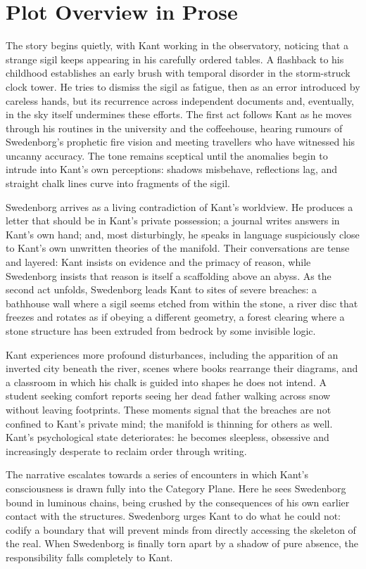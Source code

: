 \documentclass[12pt]{article}
\begin{document}
\section*{Plot Overview in Prose}

The story begins quietly, with Kant working in the observatory, noticing that a strange sigil keeps appearing in his carefully ordered tables. A flashback to his childhood establishes an early brush with temporal disorder in the storm-struck clock tower. He tries to dismiss the sigil as fatigue, then as an error introduced by careless hands, but its recurrence across independent documents and, eventually, in the sky itself undermines these efforts. The first act follows Kant as he moves through his routines in the university and the coffeehouse, hearing rumours of Swedenborg’s prophetic fire vision and meeting travellers who have witnessed his uncanny accuracy. The tone remains sceptical until the anomalies begin to intrude into Kant’s own perceptions: shadows misbehave, reflections lag, and straight chalk lines curve into fragments of the sigil.

Swedenborg arrives as a living contradiction of Kant’s worldview. He produces a letter that should be in Kant’s private possession; a journal writes answers in Kant’s own hand; and, most disturbingly, he speaks in language suspiciously close to Kant’s own unwritten theories of the manifold. Their conversations are tense and layered: Kant insists on evidence and the primacy of reason, while Swedenborg insists that reason is itself a scaffolding above an abyss. As the second act unfolds, Swedenborg leads Kant to sites of severe breaches: a bathhouse wall where a sigil seems etched from within the stone, a river disc that freezes and rotates as if obeying a different geometry, a forest clearing where a stone structure has been extruded from bedrock by some invisible logic.

Kant experiences more profound disturbances, including the apparition of an inverted city beneath the river, scenes where books rearrange their diagrams, and a classroom in which his chalk is guided into shapes he does not intend. A student seeking comfort reports seeing her dead father walking across snow without leaving footprints. These moments signal that the breaches are not confined to Kant’s private mind; the manifold is thinning for others as well. Kant’s psychological state deteriorates: he becomes sleepless, obsessive and increasingly desperate to reclaim order through writing.

The narrative escalates towards a series of encounters in which Kant’s consciousness is drawn fully into the Category Plane. Here he sees Swedenborg bound in luminous chains, being crushed by the consequences of his own earlier contact with the structures. Swedenborg urges Kant to do what he could not: codify a boundary that will prevent minds from directly accessing the skeleton of the real. When Swedenborg is finally torn apart by a shadow of pure absence, the responsibility falls completely to Kant.
\end{document}

